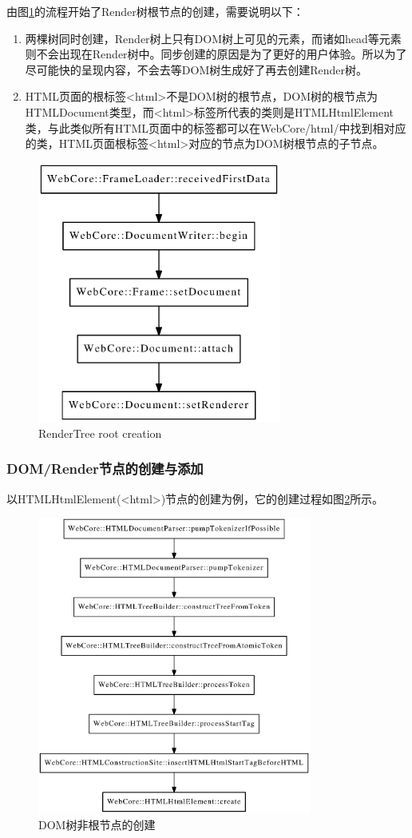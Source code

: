 由图\ref{fig:init_render_root}的流程开始了Render树根节点的创建，需要说明以下：
\begin{enumerate}
	\item 两棵树同时创建，Render树上只有DOM树上可见的元素，而诸如head等元素则不会出现在Render树中。同步创建的原因是为了更好的用户体验。所以为了尽可能快的呈现内容，不会去等DOM树生成好了再去创建Render树。
	\item HTML页面的根标签<html>不是DOM树的根节点，DOM树的根节点为HTMLDocument类型，而<html>标签所代表的类则是HTMLHtmlElement类，与此类似所有HTML页面中的标签都可以在WebCore/html/中找到相对应的类，HTML页面根标签<html>对应的节点为DOM树根节点的子节点。
\end{enumerate}
\begin{figure}[ht]
	\begin{center}
		\includegraphics[width=80mm]{image/call.ps}
	\end{center}
	\caption{RenderTree root creation}
	\label{fig:init_render_root}
\end{figure}
\subsubsection{DOM/Render节点的创建与添加}
以HTMLHtmlElement(<html>)节点的创建为例，它的创建过程如图\ref{fig:node_create}所示。
\begin{figure}[ht]
	\begin{center}
		\includegraphics[width=90mm]{image/node-create.ps}
	\end{center}
	\caption{DOM树非根节点的创建}
	\label{fig:node_create}
\end{figure}
